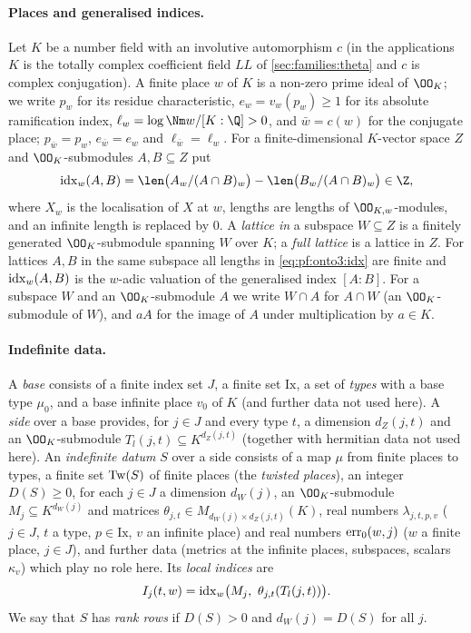 \paragraph{Places and generalised indices.}
Let $K$ be a number field with an involutive automorphism $c$ (in the applications $K$ is the totally complex
coefficient field $\mathit{LL}$ of \cref{sec:families:theta} and $c$ is complex conjugation). A finite place
$w$ of $K$ is a non-zero prime ideal of $\OO_K$; we write $p_w$ for its residue characteristic,
$e_w=v_w(p_w)\ge1$ for its absolute ramification index, $\ell_w=\log\Nm w/[K:\Q]>0$, and $\bar w=c(w)$ for the
conjugate place; $p_{\bar w}=p_w$, $e_{\bar w}=e_w$ and $\ell_{\bar w}=\ell_w$. For a finite-dimensional
$K$-vector space $Z$ and $\OO_K$-submodules $A,B\subseteq Z$ put
\begin{equation}\label{eq:pf:onto3:idx}
\ontothreeidx_w(A,B)=\len\bigl(A_w/(A\cap B)_w\bigr)-\len\bigl(B_w/(A\cap B)_w\bigr)\in\Z ,
\end{equation}
where $X_w$ is the localisation of $X$ at $w$, lengths are lengths of $\OO_{K,w}$-modules, and an infinite length
is replaced by $0$. A \emph{lattice in} a subspace $W\subseteq Z$ is a finitely generated $\OO_K$-submodule
spanning $W$ over $K$; a \emph{full lattice} is a lattice in $Z$. For lattices $A,B$ in the same subspace all
lengths in \eqref{eq:pf:onto3:idx} are finite and $\operatorname{idx}_w(A,B)$ is the $w$-adic valuation of the
generalised index $[A:B]$. For a subspace $W$ and an $\OO_K$-submodule $A$ we write $W\cap A$ for
$A\cap W$ (an $\OO_K$-submodule of $W$), and $aA$ for the image of $A$ under multiplication by $a\in K$.

\paragraph{Indefinite data.}
A \emph{base} consists of a finite index set $J$, a finite set $\mathrm{Ix}$, a set of \emph{types} with a base
type $\mu_0$, and a base infinite place $v_0$ of $K$ (and further data not used here). A \emph{side} over a base
provides, for $j\in J$ and every type $t$, a dimension $d_Z(j,t)$ and an $\OO_K$-submodule
$T_l(j,t)\subseteq K^{d_Z(j,t)}$ (together with hermitian data not used here). An \emph{indefinite datum} $S$
over a side consists of a map $\mu$ from finite places to types, a finite set $\mathrm{Tw}(S)$ of finite places
(the \emph{twisted places}), an integer $D(S)\ge0$, for each $j\in J$ a dimension $d_W(j)$, an
$\OO_K$-submodule $M_j\subseteq K^{d_W(j)}$ and matrices $\theta_{j,t}\in M_{d_W(j)\times d_Z(j,t)}(K)$, real
numbers $\lambda_{j,t,p,v}$ ($j\in J$, $t$ a type, $p\in\mathrm{Ix}$, $v$ an infinite place) and real numbers
$\mathrm{err}_0(w,j)$ ($w$ a finite place, $j\in J$), and further data (metrics at the infinite places, subspaces,
scalars $\kappa_v$) which play no role here. Its \emph{local indices} are
\begin{equation}\label{eq:pf:onto3:Iw}
I_j(t,w)=\ontothreeidx_w\bigl(M_j,\ \theta_{j,t}(T_l(j,t))\bigr).
\end{equation}
We say that $S$ has \emph{rank rows} if $D(S)>0$ and $d_W(j)=D(S)$ for all $j$.

